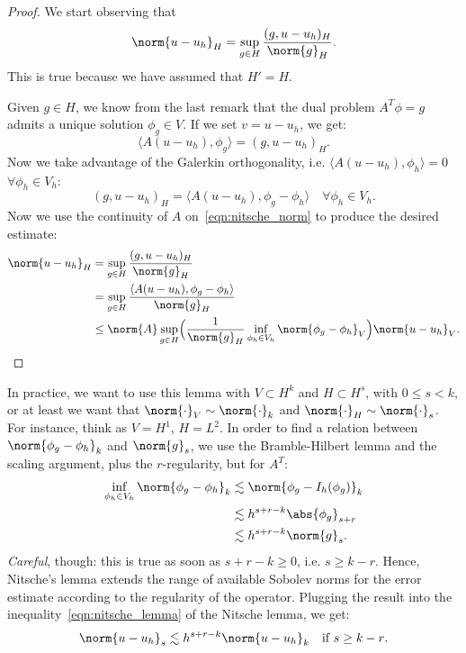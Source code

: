 \begin{proof}
We start observing that
\begin{equation}\label{eqn:nitsche_norm}
\norm{u-u_h}_H = \sup_{g \in H} \frac{(g, u-u_h)_H}{\norm{g}_H}.
\end{equation}
This is true because we have assumed that $H' = H$.

Given $g \in H$, we know from the last remark that the dual problem $A^T \phi = g$ admits a unique solution $\phi_g \in V$. If we set $v = u-u_h$, we get:
\[
\langle A (u-u_h),\phi_g \rangle = (g, u-u_h)_H.
\]
Now we take advantage of the Galerkin orthogonality, i.e. $\langle A (u-u_h), \phi_h \rangle = 0$ $\forall \phi_h \in V_h$:
\[
(g, u-u_h)_H = \langle A (u-u_h),\phi_g - \phi_h \rangle \quad \forall \phi_h \in V_h.
\]
Now we use the continuity of $A$ on~\eqref{eqn:nitsche_norm} to produce the desired estimate:
\begin{align}
\norm{u-u_h}_H &= \sup_{g \in H} \frac{(g, u-u_h)_H}{\norm{g}_H} \\
& = \sup_{g \in H} \frac{\langle A (u-u_h),\phi_g - \phi_h \rangle}{\norm{g}_H} \\
& \le \norm{A} \sup_{g \in H} \Bigl( \frac{1}{\norm{g}_H} \inf_{\phi_h \in V_h} \norm{\phi_g - \phi_h}_V \Bigr)
\norm{u-u_h}_V .
\end{align}
\end{proof}

In practice, we want to use this lemma with $V \subset H^k$ and $H \subset H^s$, with $0\le s < k$, or at least we want that $\norm{\cdot}_V \sim \norm{\cdot}_k$ and $\norm{\cdot}_H \sim \norm{\cdot}_s$. For instance, think as $V=H^1$, $H=L^2$.
In order to find a relation between $\norm{\phi_g - \phi_h}_k$ and $\norm{g}_s$, we use the Bramble-Hilbert lemma and the scaling argument, plus the $r$-regularity, but for $A^T$:
\begin{align}
\inf_{\phi_h \in V_h} \norm{\phi_g - \phi_h}_k &\lesssim \norm{\phi_g - I_h(\phi_g)}_k  \\
&\lesssim h^{s+r-k} \abs{\phi_g}_{s+r}  \\
&\lesssim h^{s+r-k} \norm{g}_s.
\end{align}
\emph{Careful}, though: this is true as soon as $s+r-k \ge 0$, i.e. $s \ge k-r$. Hence, Nitsche's lemma extends the range of available Sobolev norms for the error estimate according to the regularity of the operator. Plugging the result into the inequality~\eqref{eqn:nitsche_lemma} of the Nitsche lemma, we get:
\[
\norm{u-u_h}_s \lesssim h^{s+r-k} \norm{u-u_h}_k \quad \text{if $s \ge k-r$}.
\]

